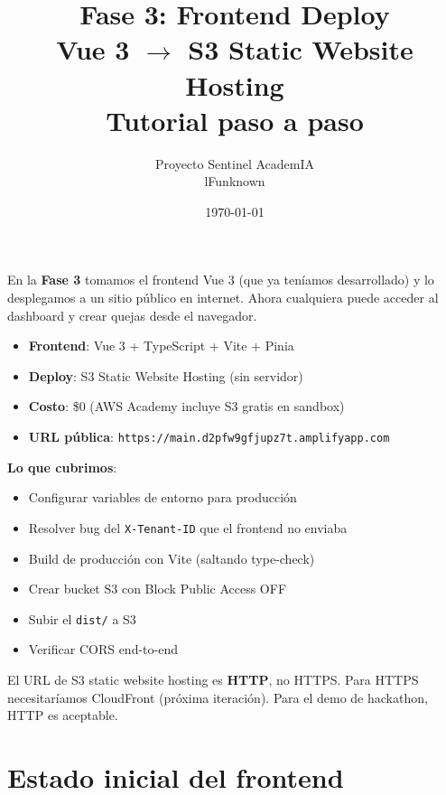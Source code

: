 \documentclass[11pt,a4paper,oneside]{article}
\title{\Huge\textbf{Fase 3: Frontend Deploy} \\[0.3em]
       \Large Vue 3 $\rightarrow$ S3 Static Website Hosting \\[0.5em]
       \normalsize Tutorial paso a paso}
\author{Proyecto Sentinel AcademIA \\ \small lFunknown}
\date{\today}
\begin{document}
\maketitle
\thispagestyle{empty}

\begin{tcolorbox}[colback=blue!5!white,colframe=infoblue,title={\textbf{¿Qué construimos en este tutorial?}}]
En la \textbf{Fase 3} tomamos el frontend Vue 3 (que ya ten\'iamos desarrollado) y lo desplegamos a un sitio p\'ublico en internet. Ahora cualquiera puede acceder al dashboard y crear quejas desde el navegador.

\begin{itemize}
  \item \textbf{Frontend}: Vue 3 + TypeScript + Vite + Pinia
  \item \textbf{Deploy}: S3 Static Website Hosting (sin servidor)
  \item \textbf{Costo}: \$0 (AWS Academy incluye S3 gratis en sandbox)
  \item \textbf{URL p\'ublica}: \texttt{https://main.d2pfw9gfjupz7t.amplifyapp.com}
\end{itemize}

\textbf{Lo que cubrimos}:
\begin{itemize}
  \item Configurar variables de entorno para producci\'on
  \item Resolver bug del \texttt{X-Tenant-ID} que el frontend no enviaba
  \item Build de producci\'on con Vite (saltando type-check)
  \item Crear bucket S3 con Block Public Access OFF
  \item Subir el \texttt{dist/} a S3
  \item Verificar CORS end-to-end
\end{itemize}
\end{tcolorbox}

\begin{tcolorbox}[colback=warnorange!5!white,colframe=warnorange,title={\textbf{Disclaimer: HTTP, no HTTPS}}]
El URL de S3 static website hosting es \textbf{HTTP}, no HTTPS. Para HTTPS necesitar\'iamos CloudFront (pr\'oxima iteraci\'on). Para el demo de hackathon, HTTP es aceptable.
\end{tcolorbox}

\tableofcontents
\newpage

\section{Estado inicial del frontend}
\end{document}
